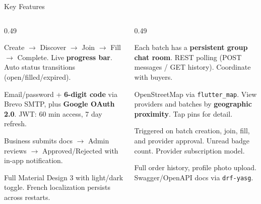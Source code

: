 \documentclass[aspectratio=169,12pt]{beamer}
\begin{document}
\begin{frame}{Key Features}
\vspace{0.08cm}
\begin{columns}[T]
\begin{column}{0.49\textwidth}
  \begin{tcolorbox}[cardbox,title={Batch Lifecycle Management}]
    \scriptsize Create \(\to\) Discover \(\to\) Join \(\to\) Fill \(\to\) Complete.
    Live \textbf{progress bar}. Auto status transitions (open/filled/expired).
  \end{tcolorbox}\vspace{0.14cm}
  \begin{tcolorbox}[cardbox,title={Dual Authentication}]
    \scriptsize Email/password + \textbf{6-digit code} via Brevo SMTP, plus
    \textbf{Google OAuth 2.0}. JWT: 60 min access, 7 day refresh.
  \end{tcolorbox}\vspace{0.14cm}
  \begin{tcolorbox}[cardbox,title={Provider Verification Workflow}]
    \scriptsize Business submits docs $\to$ Admin reviews $\to$ Approved/Rejected
    with in-app notification.
  \end{tcolorbox}\vspace{0.14cm}
  \begin{tcolorbox}[cardbox,title={Bilingual UI (EN / FR) + Themes}]
    \scriptsize Full Material Design 3 with light/dark toggle.
    French localization persists across restarts.
  \end{tcolorbox}
\end{column}
\begin{column}{0.49\textwidth}
  \begin{tcolorbox}[orangecard,title={Batch Group Chat}]
    \scriptsize Each batch has a \textbf{persistent group chat room}.
    REST polling (POST messages / GET history). Coordinate with buyers.
  \end{tcolorbox}\vspace{0.14cm}
  \begin{tcolorbox}[orangecard,title={Map-Based Discovery}]
    \scriptsize OpenStreetMap via \texttt{flutter\_map}. View providers and
    batches by \textbf{geographic proximity}. Tap pins for detail.
  \end{tcolorbox}\vspace{0.14cm}
  \begin{tcolorbox}[orangecard,title={In-App Notifications}]
    \scriptsize Triggered on batch creation, join, fill, and provider approval.
    Unread badge count. Provider subscription model.
  \end{tcolorbox}\vspace{0.14cm}
  \begin{tcolorbox}[orangecard,title={Orders, Profile \& 40+ REST Endpoints}]
    \scriptsize Full order history, profile photo upload.
    Swagger/OpenAPI docs via \texttt{drf-yasg}.
  \end{tcolorbox}
\end{column}
\end{columns}
\end{frame}
\end{document}
